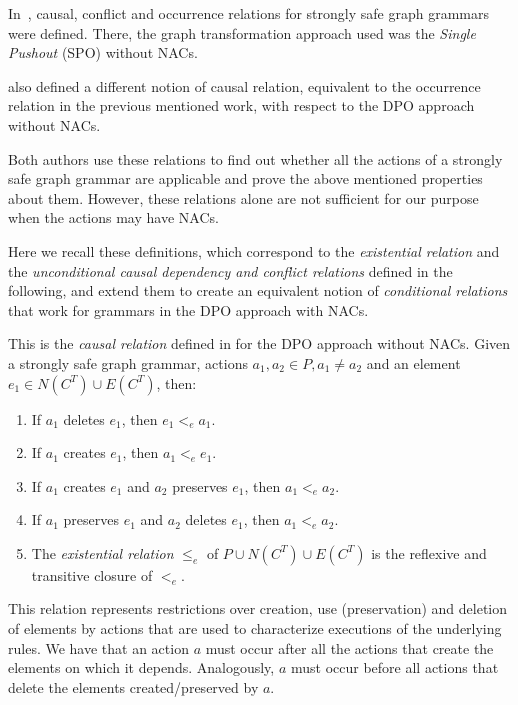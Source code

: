 In~\cite{Ribeiro1996}, causal, conflict and occurrence relations for strongly safe graph grammars were defined. There, the graph transformation approach used was the \emph{Single Pushout} (SPO) without NACs.

\cite{Corradini1996} also defined a different notion of causal relation, equivalent to the occurrence relation in the previous mentioned work, with respect to the DPO approach without NACs.

Both authors use these relations to find out whether all the actions of a strongly safe graph grammar are applicable and prove the above mentioned properties about them. However, these relations alone are not sufficient for our purpose when the actions may have NACs.

Here we recall these definitions, which correspond to the \emph{existential relation} and the \emph{unconditional causal dependency and conflict relations} defined in the following, and extend them to create an equivalent notion of \emph{conditional relations} that work for grammars in the DPO approach with NACs.

\begin{definition} This is the \emph{causal relation} defined in \cite{Corradini1996} for the DPO approach without NACs. Given  \doublyTypedGraphGrammarCore{} a strongly safe graph grammar, actions \mbox{$a_1, a_2 \in P, a_1 \ne a_2$} and an element \mbox{$e_1 \in N(C^T) \cup E(C^T)$}, then:

  \begin{enumerate}
    \item If $a_1$ deletes $e_1$, then $e_1 <_e a_1$.
    \item If $a_1$ creates $e_1$, then $a_1 <_e e_1$.
    \item If $a_1$ creates $e_1$ and $a_2$ preserves $e_1$, then $a_1 <_e a_2$.
    \item If $a_1$ preserves $e_1$ and $a_2$ deletes $e_1$, then $a_1 <_e a_2$. 
    \item The \emph{existential relation} $\leq_e$ of $P \cup N(C^T) \cup E(C^T)$ is the reflexive and transitive closure of $<_e$.
  \end{enumerate}
\end{definition}

This relation represents restrictions over creation, use (preservation) and deletion of elements by actions that are used to characterize executions of the underlying rules. We have that an action $a$ must occur after all the actions that create the elements on which it depends. Analogously, $a$ must occur before all actions that delete the elements created/preserved by $a$.

